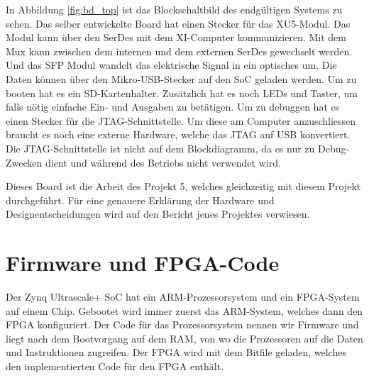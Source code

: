 \documentclass{article}
\begin{document}
In Abbildung \ref{fig:bd_top} ist das Blockschaltbild des endgültigen Systems zu sehen. Das selber entwickelte Board hat einen Stecker für das XU5-Modul. Das Modul kann über den SerDes mit dem XI-Computer kommunizieren. Mit dem Mux kann zwischen dem internen und dem externen SerDes gewechselt werden. Und das SFP Modul wandelt das elektrische Signal in ein optisches um. Die Daten können über den Mikro-USB-Stecker auf den SoC geladen werden. Um zu booten hat es ein SD-Kartenhalter. Zusätzlich hat es noch LEDs und Taster, um falls nötig einfache Ein- und Ausgaben zu betätigen. Um zu debuggen hat es einen Stecker für die JTAG-Schnittstelle. Um diese am Computer anzuschliessen braucht es noch eine externe Hardware, welche das JTAG auf USB konvertiert. Die JTAG-Schnittstelle ist nicht auf dem Blockdiagramm, da es nur zu Debug-Zwecken dient und während des Betriebs nicht verwendet wird. 

Dieses Board ist die Arbeit des Projekt 5, welches gleichzeitig mit diesem Projekt durchgeführt. Für eine genauere Erklärung der Hardware und Designentscheidungen wird auf den Bericht jenes Projektes verwiesen. 

\clearpage
\section{Firmware und FPGA-Code}

Der Zynq Ultrascale+ SoC hat ein ARM-Prozessorsystem und ein FPGA-System auf einem Chip. Gebootet wird immer zuerst das ARM-System, welches dann den FPGA konfiguriert. Der Code für das Prozessorsystem nennen wir Firmware und liegt nach dem Bootvorgang auf dem RAM, von wo die Prozessoren auf die Daten und Instruktionen zugreifen. Der FPGA wird mit dem Bitfile geladen, welches den implementierten Code für den FPGA enthält. 
\end{document}
